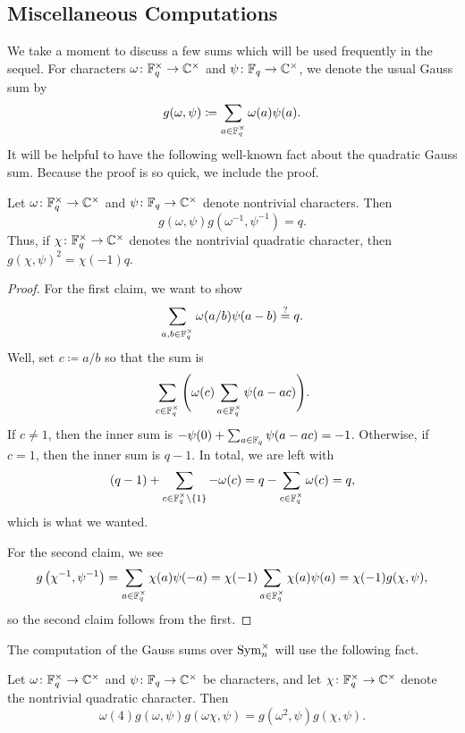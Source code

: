 \subsection{Miscellaneous Computations}
We take a moment to discuss a few sums which will be used frequently in the sequel. For characters $\omega\colon\mathbb F_q^\times\to\mathbb C^\times$ and $\psi\colon\mathbb F_q\to\mathbb C^\times$, we denote the usual Gauss sum by
\[g(\omega,\psi)\coloneqq\sum_{a\in\mathbb F_q^\times}\omega(a)\psi(a).\]
It will be helpful to have the following well-known fact about the quadratic Gauss sum. Because the proof is so quick, we include the proof.
\begin{prop} \label{prop:mag-gauss-sum}
    Let $\omega\colon\mathbb F_q^\times\to\mathbb C^\times$ and $\psi\colon\mathbb F_q\to\mathbb C^\times$ denote nontrivial characters. Then
    \[g(\omega,\psi)g\left(\omega^{-1},\psi^{-1}\right)=q.\]
    Thus, if $\chi\colon\mathbb F_q^\times\to\mathbb C^\times$ denotes the nontrivial quadratic character, then $g(\chi,\psi)^2=\chi(-1)q$.
\end{prop}
\begin{proof}
    For the first claim, we want to show
    \[\sum_{a,b\in\mathbb F_q^\times}\omega(a/b)\psi(a-b)\stackrel?=q.\]
    Well, set $c\coloneqq a/b$ so that the sum is
    \[\sum_{c\in\mathbb F_q^\times}\Bigg(\omega(c)\sum_{a\in\mathbb F_q^\times}\psi(a-ac)\Bigg).\]
    If $c\ne1$, then the inner sum is $-\psi(0)+\sum_{a\in\mathbb F_q}\psi(a-ac)=-1$. Otherwise, if $c=1$, then the inner sum is $q-1$. In total, we are left with
    \[(q-1)+\sum_{c\in\mathbb F_q^\times\setminus\{1\}}-\omega(c)=q-\sum_{c\in\mathbb F_q^\times}\omega(c)=q,\]
    which is what we wanted.

    For the second claim, we see
    \[g\left(\chi^{-1},\psi^{-1}\right)=\sum_{a\in\mathbb F_q^\times}\chi(a)\psi(-a)=\chi(-1)\sum_{a\in\mathbb F_q^\times}\chi(a)\psi(a)=\chi(-1)g(\chi,\psi),\]
    so the second claim follows from the first.
\end{proof}
The computation of the Gauss sums over $\operatorname{Sym}_n^\times$ will use the following fact.
\begin{prop} \label{prop:quad-twist-gauss-sum}
    Let $\omega\colon\mathbb F_q^\times\to\mathbb C^\times$ and $\psi\colon\mathbb F_q\to\mathbb C^\times$ be characters, and let $\chi\colon\mathbb F_q^\times\to\mathbb C^\times$ denote the nontrivial quadratic character. Then
    \[\omega(4)g(\omega,\psi)g(\omega\chi,\psi)=g\left(\omega^2,\psi\right)g(\chi,\psi).\]
\end{prop}
